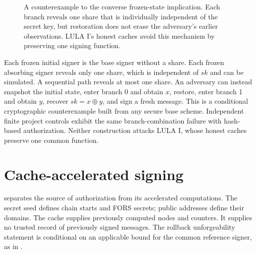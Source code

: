 \documentclass[a4paper,envcountsame,runningheads]{llncs}
\begin{document}
\begin{figure}[!htbp]
\centering
{}
\caption{A counterexample to the converse frozen-state implication. Each branch reveals one share that is individually independent of the secret key, but restoration does not erase the adversary's earlier observations. LULA I's honest caches avoid this mechanism by preserving one signing function.}\label{fig:branches}
\end{figure}

Each frozen initial signer is the base signer without a share. Each frozen absorbing signer reveals only one share, which is independent of $sk$ and can be simulated. A sequential path reveals at most one share. An adversary can instead snapshot the initial state, enter branch 0 and obtain $x$, restore, enter branch 1 and obtain $y$, recover $sk=x\oplus y$, and sign a fresh message. This is a conditional cryptographic counterexample built from any secure base scheme. Independent finite project controls exhibit the same branch-combination failure with hash-based authorization. Neither construction attacks LULA I, whose honest caches preserve one common function.

\section{Cache-accelerated signing}\label{sec:cache}
 separates the source of authorization from its accelerated computations. The secret seed defines chain starts and FORS secrets; public addresses define their domains. The cache supplies previously computed nodes and counters. It supplies no trusted record of previously signed messages. The rollback unforgeability statement is conditional on an applicable bound for the common reference signer, as in .
\end{document}
